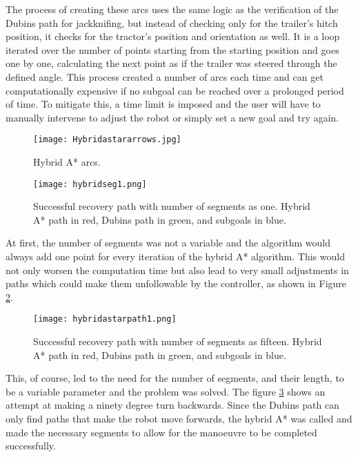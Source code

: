 The process of creating these arcs uses the same logic as the verification of the Dubins path for 
jackknifing, but instead of checking only for the trailer's hitch position, it checks for the tractor's 
position and orientation as well. It is a loop iterated over the number of points starting from the starting position 
and goes one by one, calculating the next point as if the trailer was steered through the defined angle. This 
process created a number of arcs each time and can get computationally expensive if no subgoal can 
be reached over a prolonged period of time. To mitigate this, a time limit is imposed and the user will have 
to manually intervene to adjust the robot or simply set a new goal and try again.

\begin{figure}[h]
    \centering
    \texttt{[image: Hybridastararrows.jpg]}
    \caption{Hybrid A* arcs.}
    \label{fig:arrows}
\end{figure}

\begin{figure}[h]
    \centering
    \texttt{[image: hybridseg1.png]}
    \caption{Successful recovery path with number of segments as one. Hybrid A* path in red, Dubins path in green, and subgoals in blue.}
    \label{fig:rseg1}
\end{figure}

At first, the number of segments was not a variable and the algorithm would always add 
one point for every iteration of the hybrid A* algorithm. This would not only worsen the computation 
time but also lead to very small adjustments in paths which could make them unfollowable by the controller, 
as shown in Figure \ref{fig:rseg1}.



\begin{figure}[h]
    \centering
    \texttt{[image: hybridastarpath1.png]}
    \caption{Successful recovery path with number of segments as fifteen. Hybrid A* path in red, Dubins path in green, and subgoals in blue.}
    \label{fig:recovery_module}
\end{figure}

This, of course, led to the need for the number of segments, and their length, to be a variable 
parameter and the problem was solved. The figure \ref{fig:recovery_module} shows an attempt at 
making a ninety degree turn backwards. Since the Dubins path can only find paths that make the robot move 
forwards, the hybrid A* was called and made the necessary segments to allow for the manoeuvre 
to be completed successfully.

